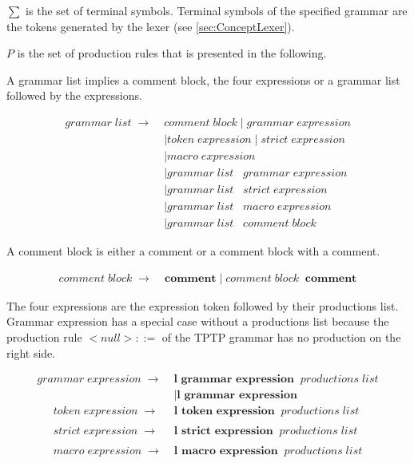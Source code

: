 $\sum$ is the set of terminal symbols. Terminal symbols of the specified grammar are the tokens generated by the lexer (see \ref{sec:ConceptLexer}).

$P$ is the set of production rules that is presented in the following. 

A grammar list implies a comment block, the four expressions or a grammar list followed by the expressions.

\begin{align*}
	grammar\;list\; \rightarrow\; &comment\;block
	     		\mid grammar\;expression  \\
			   &\mid token\;expression
                \mid strict\;expression\\
               &\mid macro\;expression \\
               &\mid grammar\;list\;\;\;grammar\;expression\\
               &\mid grammar\;list\;\;\;strict\;expression \\
               &\mid grammar\;list\;\;\;macro\;expression \\
               &\mid grammar\;list\;\;\;comment\;block               
\end{align*}

A comment block is either a comment or a comment block with a comment.

\begin{align*}
    comment\;block\; \rightarrow\; &\textbf{comment}
                \mid comment\;block\;\;\textbf{comment}
\end{align*}

The four expressions are the expression token followed by their productions list. Grammar expression has a special case without a productions list because the production rule $<null>::= $ of the \ac{TPTP} grammar has no production on the right side. 

\begin{align*}
	grammar\;expression\; \rightarrow\; &\textbf{l grammar expression}\;\;productions\;list \\ 
               &\mid \textbf{l grammar expression} 
\end{align*}
\begin{align*}        
	token\;expression\; \rightarrow\; &\textbf{l token expression} \;\;productions\;list \\ \\
	strict\;expression\; \rightarrow\; &\textbf{l strict expression} \;\;productions\;list \\ \\
	macro\;expression\; \rightarrow\; &\textbf{l macro expression} \;\;productions\;list 
\end{align*}

